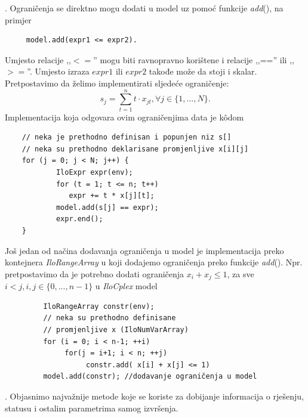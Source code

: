 \documentclass[b5paper, utf8, 11pt, colorlinks]{book}
\theoremstyle{definition}
\begin{document}
 . Ograničenja se direktno mogu dodati  u model uz pomoć funkcije \emph{add}(), na primjer
 \begin{verbatim}
 	 model.add(expr1 <= expr2).
 \end{verbatim} 	 
 	  Umjesto relacije ,,$<=$'' mogu biti ravnopravno korištene i relacije ,,=='' ili ,,$>=$''. Umjesto izraza $expr1$ ili $expr2$ takođe može da stoji i skalar. Pretpostavimo da želimo implementirati sljedeće ograničenje:
 $$s_j = \sum_{t=1}^n t \cdot x_{jt}, \forall j \in \{1,\ldots,N\}.$$ 
 Implementacija koja odgovara ovim ograničenjima data je k\^odom
 \begin{verbatim}
 	// neka je prethodno definisan i popunjen niz s[]
 	// neka su prethodno deklarisane promjenljive x[i][j]
 	for (j = 0; j < N; j++) {
 		    IloExpr expr(env);
 		    for (t = 1; t <= n; t++)
 	  	       expr += t * x[j][t];            
 		    model.add(s[j] == expr);
 		    expr.end();
 	}
 \end{verbatim}
 Još jedan od načina dodavanja ograničenja u model je implementacija preko kontejnera \emph{IloRangeArray} u koji dodajemo ograničenja preko funkcije \emph{add}().   
 Npr. pretpostavimo da je potrebno dodati ograničenja $x_i + x_j \leq 1$, za sve $i<j, i,j \in \{0,...,n-1\}$ u \emph{IloCplex} model
 
 \begin{verbatim}
 	     IloRangeArray constr(env);
 	     // neka su prethodno definisane
 	     // promjenljive x (IloNumVarArray) 
 	     for (i = 0; i < n-1; ++i)
 	          for(j = i+1; i < n; ++j)
 	               constr.add( x[i] + x[j] <= 1)     
      	 model.add(constr); //dodavanje ograničenja u model
 \end{verbatim}
 
 . Objasnimo najvažnije metode koje se koriste za dobijanje informacija o  rješenju, statusu i ostalim parametrima samog izvršenja.
  
\end{document}
